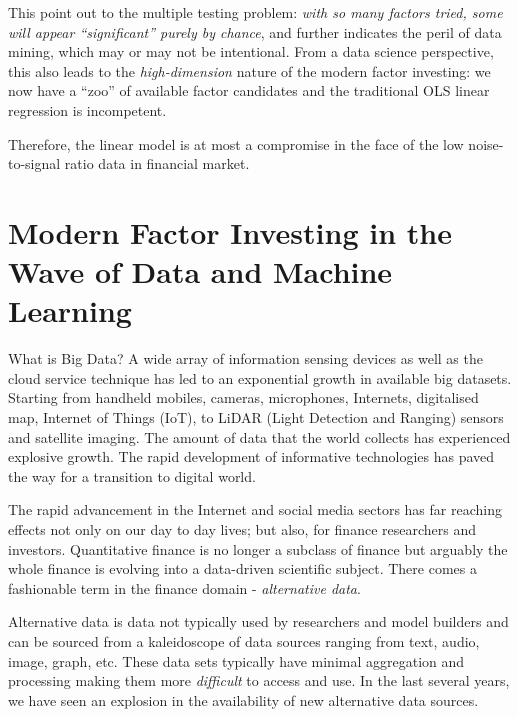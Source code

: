\documentclass[
]{book}
\begin{document}
This point out to the multiple testing problem: \emph{with so many factors tried, some will appear ``significant'' purely by chance}, and further indicates the peril of data mining, which may or may not be intentional. From a data science perspective, this also leads to the {\emph{high-dimension}} nature of the modern factor investing: we now have a ``zoo'' of available factor candidates and the traditional OLS linear regression is incompetent.

Therefore, the linear model is at most a compromise in the face of the low noise-to-signal ratio data in financial market.

\hypertarget{modern-factor-investing-in-the-wave-of-data-and-machine-learning}{%
\section{Modern Factor Investing in the Wave of Data and Machine Learning}\label{modern-factor-investing-in-the-wave-of-data-and-machine-learning}}

What is Big Data? A wide array of information sensing devices as well as the cloud service technique has led to an exponential growth in available big datasets. Starting from handheld mobiles, cameras, microphones, Internets, digitalised map, Internet of Things (IoT), to LiDAR (Light Detection and Ranging) sensors and satellite imaging. The amount of data that the world collects has experienced explosive growth. The rapid development of informative technologies has paved the way for a transition to digital world.

The rapid advancement in the Internet and social media sectors has far reaching effects not only on our day to day lives; but also, for finance researchers and investors. Quantitative finance is no longer a subclass of finance but arguably the whole finance is evolving into a data-driven scientific subject. There comes a fashionable term in the finance domain - {\emph{alternative data}}.

Alternative data is data not typically used by researchers and model builders and can be sourced from a kaleidoscope of data sources ranging from text, audio, image, graph, etc. These data sets typically have minimal aggregation and processing making them more {\emph{difficult}} to access and use. In the last several years, we have seen an explosion in the availability of new alternative data sources.
\end{document}
